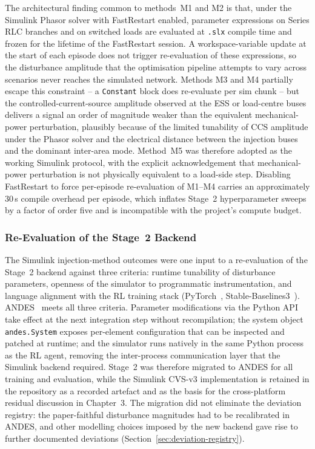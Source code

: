 \documentclass{unnc-fyp}
\begin{document}
The architectural finding common to methods~M1 and M2 is that,
under the Simulink Phasor solver with FastRestart enabled,
parameter expressions on Series RLC branches and on switched
loads are evaluated at \texttt{.slx} compile time and frozen for
the lifetime of the FastRestart session.
A workspace-variable update at the start of each episode does not
trigger re-evaluation of these expressions, so the disturbance
amplitude that the optimisation pipeline attempts to vary across
scenarios never reaches the simulated network.
Methods M3 and M4 partially escape this constraint -- a
\texttt{Constant} block does re-evaluate per sim chunk -- but the
controlled-current-source amplitude observed at the ESS or
load-centre buses delivers a signal an order of magnitude weaker
than the equivalent mechanical-power perturbation, plausibly
because of the limited tunability of CCS amplitude under the
Phasor solver and the electrical distance between the injection
buses and the dominant inter-area mode.
Method~M5 was therefore adopted as the working Simulink protocol,
with the explicit acknowledgement that mechanical-power
perturbation is not physically equivalent to a load-side step.
Disabling FastRestart to force per-episode re-evaluation of M1--M4
carries an approximately $30$\,s compile overhead per episode,
which inflates Stage~2 hyperparameter sweeps by a factor of order
five and is incompatible with the project's compute budget.

\subsubsection{Re-Evaluation of the Stage~2 Backend}

The Simulink injection-method outcomes were one input to a
re-evaluation of the Stage~2 backend against three criteria:
runtime tunability of disturbance parameters, openness of the
simulator to programmatic instrumentation, and language
alignment with the RL training stack
(PyTorch~\cite{paszke2019pytorch}, Stable-Baselines3~\cite{raffin2021sb3}).
ANDES~\cite{cui2021andes} meets all three criteria.
Parameter modifications via the Python API take effect at the
next integration step without recompilation;
the system object \texttt{andes.System} exposes per-element
configuration that can be inspected and patched at runtime;
and the simulator runs natively in the same Python process as
the RL agent, removing the inter-process communication layer that
the Simulink backend required.
Stage~2 was therefore migrated to ANDES for all training and
evaluation, while the Simulink CVS-v3 implementation is retained
in the repository as a recorded artefact and as the basis for the
cross-platform residual discussion in Chapter~3.
The migration did not eliminate the deviation registry: the
paper-faithful disturbance magnitudes had to be recalibrated in
ANDES, and other modelling choices imposed by the new backend
gave rise to further documented deviations
(Section~\ref{sec:deviation-registry}).
\end{document}
